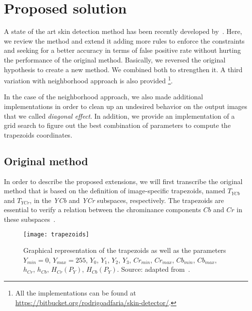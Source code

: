 \chapter{Proposed solution}
\label{cap:proposed-solution}

\noindent A state of the art skin detection method has been recently developed by~\cite{brancati:17}. Here, we review the method and extend it adding more rules to enforce the constraints and seeking for a better accuracy in terms of false positive rate without hurting the performance of the original method. Basically, we reversed the original hypothesis to create a new method. We combined both to strengthen it. A third variation with neighborhood approach is also provided \footnote{All the implementations can be found at \url{https://bitbucket.org/rodrigoadfaria/skin-detector/}.}.

In the case of the neighborhood approach, we also made additional implementations in order to clean up an undesired behavior on the output images that we called \emph{diagonal effect}. In addition, we provide an implementation of a grid search to figure out the best combination of parameters to compute the trapezoids coordinates.


\section{Original method}
\label{sec:original_method}
In order to describe the proposed extensions, we will first transcribe the original method that is based on the definition of image-specific trapezoids, named $T_{YCb}$ and $T_{YCr}$, in the \textit{YCb} and \textit{YCr} subspaces, respectively. The trapezoids are essential to verify a relation between the chrominance components $Cb$ and $Cr$ in these subspaces~\citep{brancati:17}.

\begin{figure}[ht]
    \centering
    \texttt{[image: trapezoids]}
    \caption[Graphical representation of the trapezoids as well as its parameters]{Graphical representation of the trapezoids as well as the parameters $Y_{min} = 0$, $Y_{max} = 255$, $Y_{0}$, $Y_{1}$, $Y_{2}$, $Y_{3}$, $Cr_{min}$, $Cr_{max}$, $Cb_{min}$, $Cb_{max}$, $h_{Cr}$, $h_{Cb}$, $H_{Cr}(P_Y)$, $H_{Cb}(P_Y)$. Source: adapted from~\citep{brancati:17}.}
    \label{fig:trapezoids}
\end{figure}

